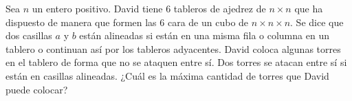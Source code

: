 Sea $n$ un entero positivo. David tiene $6$ tableros de ajedrez de $n\times n$ que ha dispuesto de manera que formen las $6$ cara de un cubo de $n\times n\times n$. Se dice que dos casillas $a$ y $b$ están alineadas si están en una misma fila o columna en un tablero o continuan así por los tableros adyacentes. David coloca algunas torres en el tablero de forma que no se ataquen entre sí. Dos torres se atacan entre sí si están en casillas alineadas. ¿Cuál es la máxima cantidad de torres que David puede colocar?